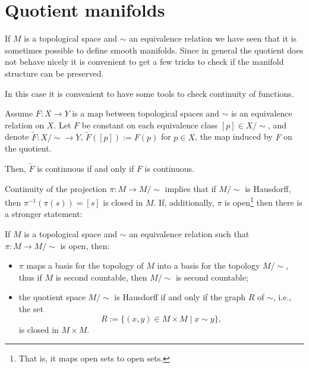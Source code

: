 \section{Quotient manifolds}\label{sec:quotient}

If $M$ is a topological space and $\sim$ an equivalence relation we have seen that it is sometimes possible to define smooth manifolds.
Since in general the quotient does not behave nicely it is convenient to get a few tricks to check if the manifold structure can be preserved.

In this case it is convenient to have some tools to check continuity of functions.

\begin{proposition}
	Assume $F:X\to Y$ is a map between topological spaces and $\sim$ is an equivalence relation on $X$.
	Let $F$ be constant on each equivalence class $[p]\in X/\!\sim$, and denote $\widetilde F:X/\!\sim\to Y$, $\widetilde F([p]) := F(p)$ for $p\in X$, the map induced by $F$ on the quotient.

	Then, $\widetilde F$ is continuous if and only if $F$ is continuous.
\end{proposition}

Continuity of the projection $\pi: M \to M/\!\sim$ implies that if $M/\!\sim$ is Hausdorff, then $\pi^{-1}(\pi(s)) = [s]$ is closed in $M$.
If, additionally, $\pi$ is open\footnote{That is, it maps open sets to open sets.} then there is a stronger statement:
\begin{theorem}\label{thm:openproj}
	If $M$ is a topological space and $\sim$ an equivalence relation such that $\pi:M \to M/\!\sim$ is open, then:
	\begin{itemize}
		\item $\pi$ maps a basis for the topology of $M$ into a basis for the topology $M/\!\sim$, thus if $M$ is second countable, then $M/\!\sim$ is second countable;
		\item the quotient space $M/\!\sim$ is Hausdorff if and only if the graph $R$ of $\sim$, i.e., the set
		      \begin{equation}
			      R := \{(x,y)\in M\times M \mid x\sim y\},
		      \end{equation}
		      is closed in $M\times M$.
	\end{itemize}
\end{theorem}

